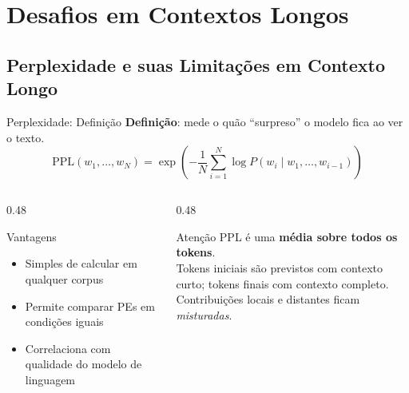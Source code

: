 \documentclass[aspectratio=169, xcolor=dvipsnames]{beamer}
\begin{document}
  \section{Desafios em Contextos Longos}
  \subsection{Perplexidade e suas Limitações em Contexto Longo}

  \begin{frame}{Perplexidade: Definição}
    \textbf{Definição}: mede o quão ``surpreso'' o modelo fica ao ver o texto.
    \[
      \mathrm{PPL}(w_1,\ldots,w_N)
        = \exp\!\left(-\frac{1}{N}\sum_{i=1}^{N}\log P(w_i \mid w_1,\ldots,w_{i-1})\right)
    \]

    \vspace{0.3em}
    \begin{columns}[T]
      \begin{column}{0.48\textwidth}
        \begin{block}{Vantagens}
          \begin{itemize}
            \item Simples de calcular em qualquer corpus
            \item Permite comparar PEs em condições iguais
            \item Correlaciona com qualidade do modelo de linguagem
          \end{itemize}
        \end{block}
      \end{column}
      \begin{column}{0.48\textwidth}
        \begin{alertblock}{Atenção}
          PPL é uma \textbf{média sobre todos os tokens}.\\[0.3em]
          Tokens iniciais são previstos com contexto curto; tokens finais com contexto completo.\\[0.3em]
          Contribuições locais e distantes ficam \textit{misturadas}.
        \end{alertblock}
      \end{column}
    \end{columns}
  \end{frame}
\end{document}
